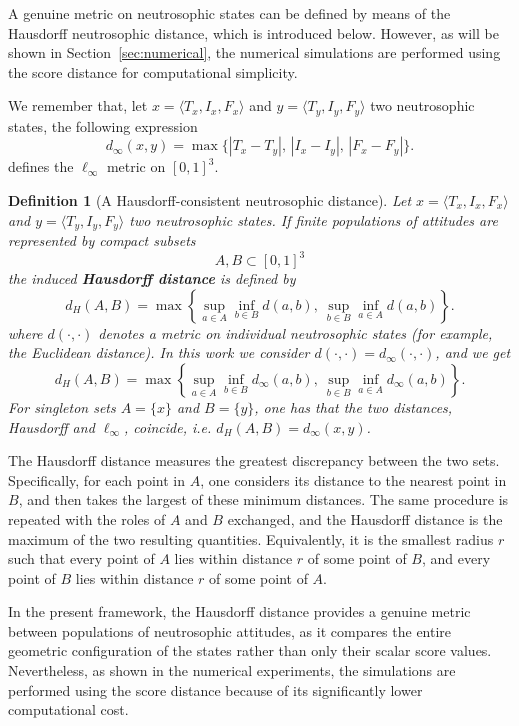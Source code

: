 \documentclass[11pt,a4paper]{article}
\newtheorem{definition}[theorem]{Definition}
\newcommand{\nstriple}[1]{\langle #1 \rangle}
\begin{document}
	\medskip
	A genuine metric on neutrosophic states can be defined by means of the Hausdorff neutrosophic distance, which is introduced below. 
	However, as will be shown in Section~\ref{sec:numerical}, the numerical simulations are performed using the score distance for computational simplicity.
	
	We remember that, let $x = \nstriple{T_x,I_x,F_x}$ and $y = \nstriple{T_y,I_y,F_y}$ two neutrosophic states, the following expression 
	$$
	d_\infty(x,y) = \max\{ |T_x-T_y|,\,|I_x-I_y|,\, |F_x-F_y| \}.
	$$ 
	defines the $\ell_\infty$ metric on $[0,1]^3$.
	
	\begin{definition}[A Hausdorff-consistent neutrosophic distance]
		Let $x = \nstriple{T_x,I_x,F_x}$ and $y = \nstriple{T_y,I_y,F_y}$ two neutrosophic states. If finite populations of attitudes are represented by compact subsets 
		$$
		A,B\subset[0,1]^3
		$$ 
		the induced \textbf{Hausdorff distance} is defined by
		$$
		d_H(A,B) = \max \left\{ \sup_{a\in A} \inf_{b\in B} d(a,b),\ \sup_{b\in B}\inf_{a\in A} d(a,b) \right\}.
		$$
		where $d(\cdot,\cdot)$ denotes a metric on individual neutrosophic states (for example, the Euclidean distance). In this work we consider $d(\cdot,\cdot)=d_\infty(\cdot,\cdot)$, and we get
		\begin{equation}\label{eq:hausdorff}
			d_H(A,B) = \max \left\{ \sup_{a\in A} \inf_{b\in B} d_\infty(a,b),\ \sup_{b\in B}\inf_{a\in A} d_\infty(a,b) \right\}.
		\end{equation}
		For singleton sets $A = \{x\}$ and $B = \{y\}$, one has that the two distances, Hausdorff and $\ell_\infty$, coincide, \emph{i.e.} $d_H(A,B) = d_\infty(x,y)$. 
	\end{definition}
	
	\medskip
	The Hausdorff distance measures the greatest discrepancy between the two sets. Specifically, for each point in $A$, one considers its distance to the nearest point in $B$, and then takes the largest of these minimum distances. The same procedure is repeated with the roles of $A$ and $B$ exchanged, and the Hausdorff distance is the maximum of the two resulting quantities. Equivalently, it is the smallest radius $r$ such that every point of $A$ lies within distance $r$ of some point of $B$, and every point of $B$ lies within distance $r$ of some point of $A$.
	
	In the present framework, the Hausdorff distance provides a genuine metric between populations of neutrosophic attitudes, as it compares the entire geometric configuration of the states rather than only their scalar score values. Nevertheless, as shown in the numerical experiments, the simulations are performed using the score distance because of its significantly lower computational cost.
	
\end{document}
